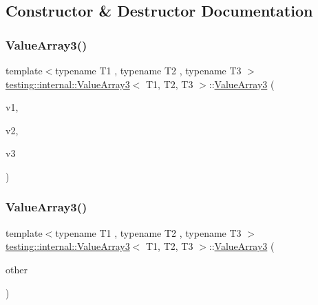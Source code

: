 \subsection{Constructor \& Destructor Documentation}
\mbox{\label{classtesting_1_1internal_1_1_value_array3_aa83b0671fed7a231ba127600c904246d}} 
\subsubsection{\texorpdfstring{ValueArray3()}{ValueArray3()}\hspace{0.1cm}{\footnotesize\ttfamily [1/2]}}
{\footnotesize\ttfamily template$<$typename T1 , typename T2 , typename T3 $>$ \\
\mbox{\hyperlink{classtesting_1_1internal_1_1_value_array3}{testing\+::internal\+::\+Value\+Array3}}$<$ T1, T2, T3 $>$\+::\mbox{\hyperlink{classtesting_1_1internal_1_1_value_array3}{Value\+Array3}} (\begin{DoxyParamCaption}\item[{T1}]{v1,  }\item[{T2}]{v2,  }\item[{T3}]{v3 }\end{DoxyParamCaption})\hspace{0.3cm}{\ttfamily [inline]}}

\mbox{\label{classtesting_1_1internal_1_1_value_array3_a742d8b00de6b63b020740ebbc7bc8d31}} 
\subsubsection{\texorpdfstring{ValueArray3()}{ValueArray3()}\hspace{0.1cm}{\footnotesize\ttfamily [2/2]}}
{\footnotesize\ttfamily template$<$typename T1 , typename T2 , typename T3 $>$ \\
\mbox{\hyperlink{classtesting_1_1internal_1_1_value_array3}{testing\+::internal\+::\+Value\+Array3}}$<$ T1, T2, T3 $>$\+::\mbox{\hyperlink{classtesting_1_1internal_1_1_value_array3}{Value\+Array3}} (\begin{DoxyParamCaption}\item[{const \mbox{\hyperlink{classtesting_1_1internal_1_1_value_array3}{Value\+Array3}}$<$ T1, T2, T3 $>$ \&}]{other }\end{DoxyParamCaption})\hspace{0.3cm}{\ttfamily [inline]}}



